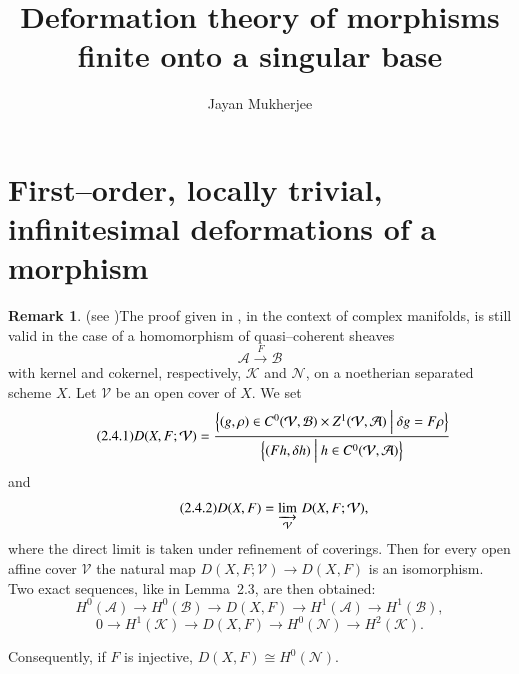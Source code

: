\documentclass[11pt,twoside]{amsart}
\theoremstyle{plain}
\numberwithin{equation}{section}
\theoremstyle{definition}
\newtheorem{remark}[theorem]{Remark}
\begin{document}
\title[Deformation theory of morphisms finite onto a singular base ]{Deformation theory of morphisms finite onto a singular base}

\author[J. Mukherjee]{Jayan Mukherjee}
\address{Department of Mathematics, Oklahoma State University, Stillwater, USA}

\maketitle

\section{First--order, locally trivial, infinitesimal deformations of a morphism}



\begin{remark}(see \cite[2.4]{Gon06})\label{D(X F)}
The proof given in , in the context of complex manifolds, is still valid
in the case of a homomorphism of quasi--coherent sheaves
\[
\mathcal A \xrightarrow{\,F\,} \mathcal B
\]
with kernel and cokernel, respectively, $\mathcal K$ and $\mathcal N$, on a noetherian separated scheme $X$.
Let $\mathcal V$ be an open cover of $X$. We set
\begin{equation}\tag{2.4.1}
D(X,F;\mathcal V)
=
\frac{\Bigl\{(g,\rho)\in C^{0}(\mathcal V,\mathcal B)\times Z^{1}(\mathcal V,\mathcal A)\ \Big|\ 
\delta g = F\rho\Bigr\}}
{\Bigl\{(Fh,\delta h)\ \Big|\ h\in C^{0}(\mathcal V,\mathcal A)\Bigr\}}
\end{equation}
and
\begin{equation}\tag{2.4.2}
D(X,F)=\varinjlim_{\mathcal V}\, D(X,F;\mathcal V),
\end{equation}
where the direct limit is taken under refinement of coverings. Then for every open affine cover
$\mathcal V$ the natural map $D(X,F;\mathcal V)\to D(X,F)$ is an isomorphism.
Two exact sequences, like in Lemma~2.3, are then obtained:
\[
H^{0}(\mathcal A)\longrightarrow H^{0}(\mathcal B)\longrightarrow D(X,F)
\longrightarrow H^{1}(\mathcal A)\longrightarrow H^{1}(\mathcal B),
\]
\[
0\longrightarrow H^{1}(\mathcal K)\longrightarrow D(X,F)\longrightarrow H^{0}(\mathcal N)
\longrightarrow H^{2}(\mathcal K).
\]

Consequently, if $F$ is injective, $D(X,F) \cong H^0(\mathcal{N})$. 

\end{remark}
\end{document}
